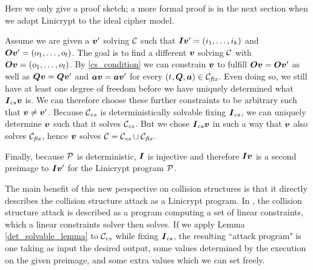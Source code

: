 Here we only give a proof sketch; a more formal proof is in the next section when we adapt Linicrypt to the ideal cipher model.
\begin{sketch}
Assume we are given a $\vv'$ solving $\C$ such that $\I \vv' = \vec i k$ and $\O \vv' = \vec o l$.
The goal is to find a different $\vv$ solving $\C$ with $\O \vv = \vec o l$.
By \eqref{cs_condition} we can constrain $\vv$ to fulfill $\O \vv = \O \vv'$
as well as $\Q \vv = \Q \vv'$ and $\va\vv = \va\vv'$ for every $(t, \Q, \va) \in \Cfix$.
Even doing so, we still have at least one degree of freedom before we have uniquely determined what
$\I_{cs} \vv$ is.
We can therefore choose these further constraints to be arbitrary such that $\vv \neq \vv'$.
Because $\Ccs$ is deterministically solvable fixing $\I_{cs}$,
we can uniquely determine $\vv$ such that it solves $\Ccs$.
But we chose $\I_{cs} \vv$ in such a way that $\vv$ also solves $\Cfix$,
hence $\vv$ solves $\C = \Ccs \cup \Cfix$.

Finally, because $\P$ is deterministic, $\I$ is injective and therefore
$\I\vv$ is a second preimage to $\I\vv'$ for the Linicrypt program $\P$.
\end{sketch}

The main benefit of this new perspective on collision structures is that it directly describes the collision structure attack as a Linicrypt program.
In \cite{TCC:McQSwoRos19}, the collision structure attack is described as a program computing a set of linear constraints, which a linear constraints solver then solves.
If we apply Lemma \ref{det_solvable_lemma} to $\Ccs$ while fixing $\I_{cs}$,
the resulting ``attack program" is one taking as input the desired output,
some values determined by the execution on the given preimage,
and some extra values which we can set freely.

